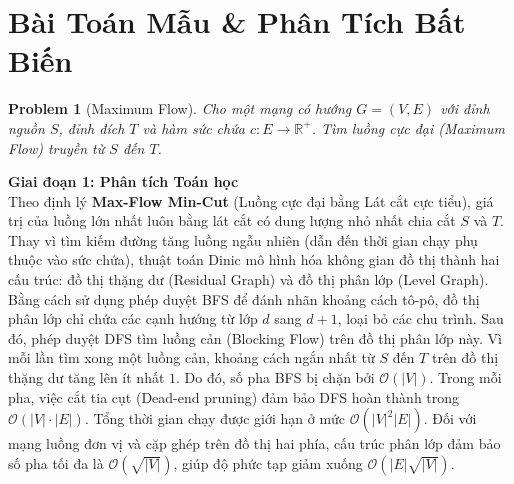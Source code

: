 \documentclass[11pt, letterpaper]{report}
\newtheorem{baitoan}{Problem}[chapter]
\begin{document}
\section{Bài Toán Mẫu \& Phân Tích Bất Biến}
\begin{baitoan}[Maximum Flow]
Cho một mạng có hướng $G = (V, E)$ với đỉnh nguồn $S$, đỉnh đích $T$ và hàm sức chứa $c: E \to \mathbb{R}^+$. Tìm luồng cực đại (Maximum Flow) truyền từ $S$ đến $T$.
\end{baitoan}

\noindent\textbf{Giai đoạn 1: Phân tích Toán học}\\
Theo định lý \textbf{Max-Flow Min-Cut} (Luồng cực đại bằng Lát cắt cực tiểu), giá trị của luồng lớn nhất luôn bằng lát cắt có dung lượng nhỏ nhất chia cắt $S$ và $T$.
Thay vì tìm kiếm đường tăng luồng ngẫu nhiên (dẫn đến thời gian chạy phụ thuộc vào sức chứa), thuật toán Dinic mô hình hóa không gian đồ thị thành hai cấu trúc: đồ thị thặng dư (Residual Graph) và đồ thị phân lớp (Level Graph).
Bằng cách sử dụng phép duyệt BFS để đánh nhãn khoảng cách tô-pô, đồ thị phân lớp chỉ chứa các cạnh hướng từ lớp $d$ sang $d+1$, loại bỏ các chu trình. Sau đó, phép duyệt DFS tìm luồng cản (Blocking Flow) trên đồ thị phân lớp này.
Vì mỗi lần tìm xong một luồng cản, khoảng cách ngắn nhất từ $S$ đến $T$ trên đồ thị thặng dư tăng lên ít nhất $1$. Do đó, số pha BFS bị chặn bởi $\mathcal{O}(|V|)$. Trong mỗi pha, việc cắt tia cụt (Dead-end pruning) đảm bảo DFS hoàn thành trong $\mathcal{O}(|V| \cdot |E|)$. Tổng thời gian chạy được giới hạn ở mức $\mathcal{O}(|V|^2 |E|)$. Đối với mạng luồng đơn vị và cặp ghép trên đồ thị hai phía, cấu trúc phân lớp đảm bảo số pha tối đa là $\mathcal{O}(\sqrt{|V|})$, giúp độ phức tạp giảm xuống $\mathcal{O}(|E| \sqrt{|V|})$.
\end{document}
